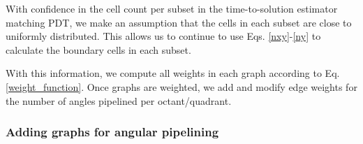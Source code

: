 \documentclass[times,final]{elsarticle}
\begin{document}
With confidence in the cell count per subset in the time-to-solution estimator matching PDT, we make an assumption that the cells in each subset are close to uniformly distributed. This allows us to continue to use Eqs. \ref{nxy}-\ref{ny} to calculate the boundary cells in each subset.

With this information, we compute all weights in each graph according to Eq. \ref{weight_function}.
Once graphs are weighted, we add and modify edge weights for the number of angles pipelined per octant/quadrant.

\subsubsection{Adding graphs for angular pipelining}
\end{document}
